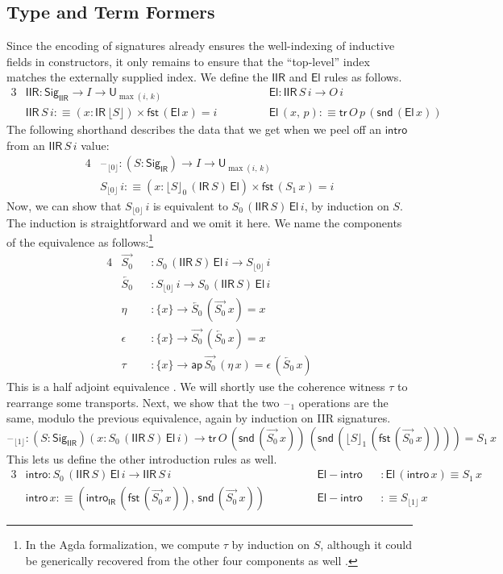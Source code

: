 \documentclass[acmsmall,screen,review,anonymous]{acmart}
\newcommand{\msf}[1]{{\mathsf{#1}}}
\newcommand{\U}{\msf{U}}
\newcommand{\El}{\msf{El}}
\newcommand{\Sig}{\msf{Sig}}
\newcommand{\blank}{{\mathord{\hspace{1pt}\text{--}\hspace{1pt}}}}
\newcommand{\IR}{\msf{IR}}
\newcommand{\intro}{\msf{intro}}
\newcommand{\tr}{\msf{tr}}
\newcommand{\fst}{\msf{fst}}
\newcommand{\snd}{\msf{snd}}
\newcommand{\IIR}{\msf{IIR}}
\newcommand{\Sigr}[1]{\lfloor #1 \rfloor}
\newcommand{\floord}[1]{\lfloor #1 \rfloor}
\newcommand{\ora}[1]{\overrightarrow{#1}}
\newcommand{\ola}[1]{\overleftarrow{#1}}
\newcommand{\ap}{\msf{ap}}
\begin{document}
\subsection{Type and Term Formers}\label{sec:iir-construction-type-term} Since the encoding of signatures
already ensures the well-indexing of inductive fields in constructors, it only remains to ensure
that the ``top-level'' index matches the externally supplied index. We define the $\IIR$ and $\El$
rules as follows.
\begin{alignat*}{3}
  &\IIR : \Sig_\IIR \to I \to \U_{\max(i,\,k)}                         && \El : \IIR\,S\,i \to O\,i \\
  &\IIR\,S\,i :\equiv (x : \IR\,\Sigr{S}) \times \fst\,(\El\,x) = i \hspace{3em}&& \El\,(x,\,p) :\equiv \tr\,O\,p\,(\snd\,(\El\,x))
\end{alignat*}
The following shorthand describes the data that we get when we peel off an $\intro$ from an $\IIR\,S\,i$ value:
\begin{alignat*}{4}
  &\blank_{\floord{0}} : (S : \Sig_\IR) \to I \to \U_{\max(i,\,k)}\\
  &S_{\floord{0}}\,i :\equiv (x : \floord{S}_0\,(\IR\,S)\,\El) \times \fst\,(S_1\,x) = i
\end{alignat*}
Now, we can show that $S_{\floord{0}}\,i$ is equivalent to $S_0\,(\IIR\,S)\,\El\,i$, by induction on
$S$. The induction is straightforward and we omit it here. We name the components of the equivalence
as follows:\footnote{In the Agda formalization, we
compute $\tau$ by induction on $S$, although it could be generically recovered from the other
four components as well \cite[Section~4.2]{hottbook}.}
\begin{alignat*}{4}
  &\ora{S_0} &&: S_0\,(\IIR\,S)\,\El\,i \to S_{\floord{0}}\,i \\
  &\ola{S_0} &&: S_{\floord{0}}\,i \to S_0\,(\IIR\,S)\,\El\,i \\
  &\eta      &&: \{x\} \to \ola{S_0}\,(\ora{S_0}\,x) = x \\
  &\epsilon  &&: \{x\} \to \ora{S_0}\,(\ola{S_0}\,x) = x \\
  &\tau      &&: \{x\} \to \ap\,\ora{S_0}\,(\eta\,x) = \epsilon\,(\ola{S_0}\,x)
\end{alignat*}
This is a half adjoint equivalence \cite[Section~4.2]{hottbook}. We will shortly use the coherence
witness $\tau$ to rearrange some transports. Next, we show that the two $\blank_1$ operations are
the same, modulo the previous equivalence, again by induction on IIR signatures.
\[\blank_{\floord{1}} : (S : \Sig_\IIR)(x : S_0\,(\IIR\,S)\,\El\,i) \to \tr\,O\,(\snd\,(\ora{S_0}\,x))\,(\snd\,(\floord{S}_1\,(\fst\,(\ora{S_0}\,x)))) = S_1\,x\]
This lets us define the other introduction rules as well.
\begin{alignat*}{3}
  &\intro    : S_0\,(\IIR\,S)\,\El\,i \to \IIR\,S\,i && \msf{El\!\!-\!\!intro} && : \El\,(\intro\,x) \equiv S_1\,x \\
  &\intro\,x :\equiv (\intro_\IR\,(\fst\,(\ora{S_0}\,x)),\,\snd\,(\ora{S_0}\,x)) \quad\quad\quad&& \msf{El\!\!-\!\!intro} && :\equiv S_{\floord{1}}\,x
\end{alignat*}
\end{document}
